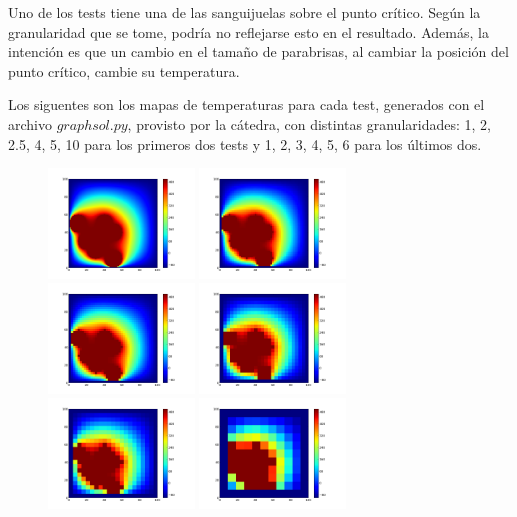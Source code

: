 \documentclass[a4paper]{article}
\begin{document}
Uno de los tests tiene una de las sanguijuelas sobre el punto crítico. Según la granularidad que se tome, podría no reflejarse esto en el resultado. Además, la intención es que un cambio en el tamaño de parabrisas, al cambiar la posición del punto crítico, cambie su temperatura.
  
Los siguentes son los mapas de temperaturas para cada test, generados con el archivo $graphsol.py$, provisto por la cátedra, con distintas granularidades: 1, 2, 2.5, 4, 5, 10 para los primeros dos tests y 1, 2, 3, 4, 5, 6 para los últimos dos.
\begin{center}
\begin{figure}[h!]
\centering
\includegraphics[width=110pt]{img/Parabrisas1-1.png} \includegraphics[width=110pt]{img/Parabrisas1-2.png} \includegraphics[width=110pt]{img/Parabrisas1-2,5.png} \newline \includegraphics[width=110pt]{img/Parabrisas1-4.png} \includegraphics[width=110pt]{img/Parabrisas1-5.png} \includegraphics[width=110pt]{img/Parabrisas1-10.png} \newline

\end{figure}
\end{center}
\end{document}
